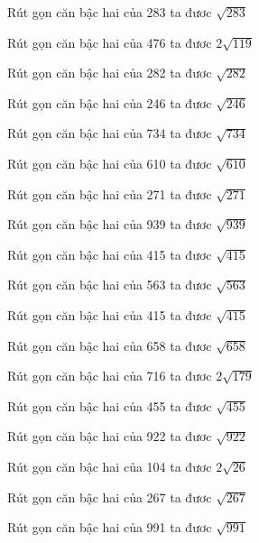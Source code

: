 \documentclass[12pt,a4paper]{article}
\begin{document}
\begin{ex}
Rút gọn căn bậc hai của 283 ta đươc $\sqrt{283}$
\end{ex}
\begin{ex}
Rút gọn căn bậc hai của 476 ta đươc $2\sqrt{119}$
\end{ex}
\begin{ex}
Rút gọn căn bậc hai của 282 ta đươc $\sqrt{282}$
\end{ex}
\begin{ex}
Rút gọn căn bậc hai của 246 ta đươc $\sqrt{246}$
\end{ex}
\begin{ex}
Rút gọn căn bậc hai của 734 ta đươc $\sqrt{734}$
\end{ex}
\begin{ex}
Rút gọn căn bậc hai của 610 ta đươc $\sqrt{610}$
\end{ex}
\begin{ex}
Rút gọn căn bậc hai của 271 ta đươc $\sqrt{271}$
\end{ex}
\begin{ex}
Rút gọn căn bậc hai của 939 ta đươc $\sqrt{939}$
\end{ex}
\begin{ex}
Rút gọn căn bậc hai của 415 ta đươc $\sqrt{415}$
\end{ex}
\begin{ex}
Rút gọn căn bậc hai của 563 ta đươc $\sqrt{563}$
\end{ex}
\begin{ex}
Rút gọn căn bậc hai của 415 ta đươc $\sqrt{415}$
\end{ex}
\begin{ex}
Rút gọn căn bậc hai của 658 ta đươc $\sqrt{658}$
\end{ex}
\begin{ex}
Rút gọn căn bậc hai của 716 ta đươc $2\sqrt{179}$
\end{ex}
\begin{ex}
Rút gọn căn bậc hai của 455 ta đươc $\sqrt{455}$
\end{ex}
\begin{ex}
Rút gọn căn bậc hai của 922 ta đươc $\sqrt{922}$
\end{ex}
\begin{ex}
Rút gọn căn bậc hai của 104 ta đươc $2\sqrt{26}$
\end{ex}
\begin{ex}
Rút gọn căn bậc hai của 267 ta đươc $\sqrt{267}$
\end{ex}
\begin{ex}
Rút gọn căn bậc hai của 991 ta đươc $\sqrt{991}$
\end{ex}
\end{document}
